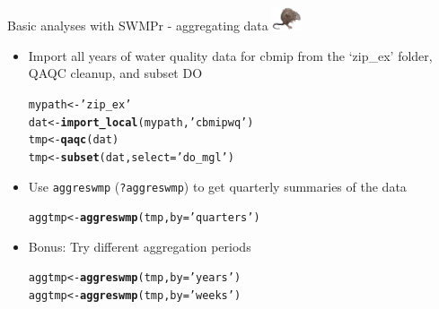 \documentclass[xcolor=dvipsnames]{beamer}\usepackage[]{graphicx}\usepackage[]{color}
\makeatletter
\newcommand{\hlstr}[1]{\textcolor[rgb]{0.192,0.494,0.8}{#1}}%
\newcommand{\hlstd}[1]{\textcolor[rgb]{0.345,0.345,0.345}{#1}}%
\newcommand{\hlkwb}[1]{\textcolor[rgb]{0.69,0.353,0.396}{#1}}%
\newcommand{\hlkwc}[1]{\textcolor[rgb]{0.333,0.667,0.333}{#1}}%
\newcommand{\hlkwd}[1]{\textcolor[rgb]{0.737,0.353,0.396}{\textbf{#1}}}%
\newenvironment{kframe}{%
 \def\at@end@of@kframe{}%
 \ifinner\ifhmode%
  \def\at@end@of@kframe{\end{minipage}}%
  \begin{minipage}{\columnwidth}%
 \fi\fi%
 \def\FrameCommand##1{\hskip\@totalleftmargin \hskip-\fboxsep
 \colorbox{shadecolor}{##1}\hskip-\fboxsep
     \hskip-\linewidth \hskip-\@totalleftmargin \hskip\columnwidth}%
 \MakeFramed {\advance\hsize-\width
   \@totalleftmargin\z@ \linewidth\hsize
   \@setminipage}}%
 {\par\unskip\endMakeFramed%
 \at@end@of@kframe}
\newenvironment{knitrout}{}{} %
\makeatother
\begin{document}
\begin{frame}[fragile,t]{Basic analyses with SWMPr - aggregating data \includegraphics[width = 0.065\textwidth]{imgs/swmprat.png}}
\begin{itemize}
\item {}
Import all years of water quality data for cbmip from the `zip\_ex' folder, QAQC cleanup, and subset DO
\begin{knitrout}\scriptsize
{}\color{fgcolor}\begin{kframe}
\begin{alltt}
\hlstd{mypath} \hlkwb{<-} \hlstr{'zip_ex'}
\hlstd{dat} \hlkwb{<-} \hlkwd{import_local}\hlstd{(mypath,} \hlstr{'cbmipwq'}\hlstd{)}
\hlstd{tmp} \hlkwb{<-} \hlkwd{qaqc}\hlstd{(dat)}
\hlstd{tmp} \hlkwb{<-} \hlkwd{subset}\hlstd{(dat,} \hlkwc{select} \hlstd{=} \hlstr{'do_mgl'}\hlstd{)}
\end{alltt}
\end{kframe}
\end{knitrout}
\vspace{0.1in}
\item {}
Use \texttt{aggreswmp} (\texttt{?aggreswmp}) to get quarterly summaries of the data
\begin{knitrout}\scriptsize
{}\color{fgcolor}\begin{kframe}
\begin{alltt}
\hlstd{aggtmp} \hlkwb{<-} \hlkwd{aggreswmp}\hlstd{(tmp,} \hlkwc{by} \hlstd{=} \hlstr{'quarters'}\hlstd{)}
\end{alltt}
\end{kframe}
\end{knitrout}
\vspace{0.1in}
\item {}
Bonus: Try different aggregation periods
\begin{knitrout}\scriptsize
{}\color{fgcolor}\begin{kframe}
\begin{alltt}
\hlstd{aggtmp} \hlkwb{<-} \hlkwd{aggreswmp}\hlstd{(tmp,} \hlkwc{by} \hlstd{=} \hlstr{'years'}\hlstd{)}
\hlstd{aggtmp} \hlkwb{<-} \hlkwd{aggreswmp}\hlstd{(tmp,} \hlkwc{by} \hlstd{=} \hlstr{'weeks'}\hlstd{)}
\end{alltt}

\end{kframe}
\end{knitrout}
\end{itemize}
\end{frame}
\end{document}
